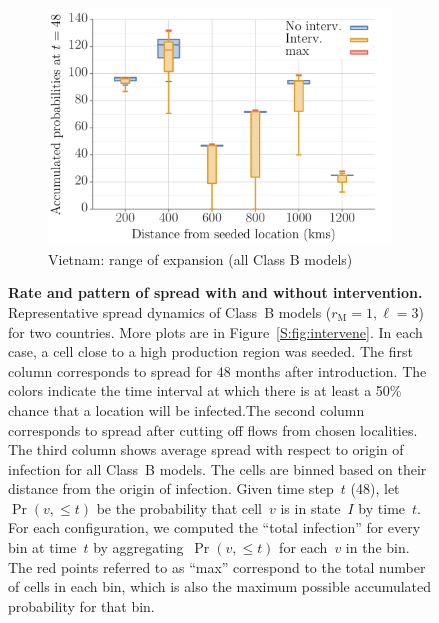 \documentclass[11pt]{article}
\newcommand{\mooreRange}{r_\mathrm{M}}
\theoremstyle{definition}
\begin{document}
\begin{figure}[ht]
\begin{subfigure}[b]{.43\textwidth}
\includegraphics[width=\textwidth]{../cellular_automata/results/dist_inf_plots/VN_dist_prob_B_box.pdf}
\caption{Vietnam: range of expansion (all Class B models)\label{fig:vnmBContourBox}}
\end{subfigure}
\caption{\textbf{Rate and pattern of spread with and without intervention.}
Representative spread dynamics of Class~B models ($\mooreRange=1, \ell=3$)
for two countries. More plots are in Figure~\ref{S:fig:intervene}. In each
case, a cell close to a high production region was seeded. The first column
corresponds to spread for 48 months after introduction. The colors indicate
the time interval at which there is at least a 50\% chance that a location
will be infected.The second column corresponds to spread after cutting off
flows from chosen localities. The third column shows average spread with
respect to origin of infection for all Class~B models. The cells are binned
based on their distance from the origin of infection. Given time step~$t$
(48), let $\Pr(v,\le t)$ be the probability that cell~$v$ is in state~$I$
by time~$t$. For each configuration, we computed the ``total
infection'' for every bin at time~$t$ by aggregating~$\Pr(v,\le t)$ for
each~$v$ in the bin. The red points referred to as ``max'' correspond to
the total number of cells in each bin, which is also the maximum possible
accumulated probability for that bin.
\label{fig:spread}}
\end{figure}
\end{document}
